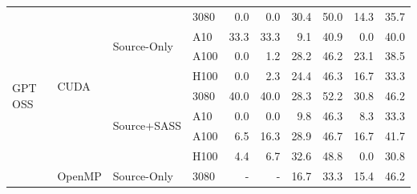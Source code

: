\begin{tabular}{@{}llllrrrrrr@{}}
\midrule
\multirow{16}{*}{GPT OSS} & \multirow{8}{*}{CUDA} & \multirow{4}{*}{Source-Only} & 3080 & \cellcolor[rgb]{1.000,1.000,1.000}0.0 & \cellcolor[rgb]{1.000,1.000,1.000}0.0 & \cellcolor[rgb]{1.000,0.851,0.851}30.4 & \cellcolor[rgb]{1.000,0.670,0.670}50.0 & \cellcolor[rgb]{1.000,0.955,0.955}14.3 & \cellcolor[rgb]{1.000,0.808,0.808}35.7 \\
 &  &  & A10 & \cellcolor[rgb]{1.000,0.828,0.828}33.3 & \cellcolor[rgb]{1.000,0.828,0.828}33.3 & \cellcolor[rgb]{1.000,0.978,0.978}9.1 & \cellcolor[rgb]{1.000,0.761,0.761}40.9 & \cellcolor[rgb]{1.000,1.000,1.000}0.0 & \cellcolor[rgb]{1.000,0.769,0.769}40.0 \\
 &  &  & A100 & \cellcolor[rgb]{1.000,1.000,1.000}0.0 & \cellcolor[rgb]{1.000,0.999,0.999}1.2 & \cellcolor[rgb]{1.000,0.868,0.868}28.2 & \cellcolor[rgb]{1.000,0.709,0.709}46.2 & \cellcolor[rgb]{1.000,0.904,0.904}23.1 & \cellcolor[rgb]{1.000,0.783,0.783}38.5 \\
 &  &  & H100 & \cellcolor[rgb]{1.000,1.000,1.000}0.0 & \cellcolor[rgb]{1.000,0.998,0.998}2.3 & \cellcolor[rgb]{1.000,0.895,0.895}24.4 & \cellcolor[rgb]{1.000,0.708,0.708}46.3 & \cellcolor[rgb]{1.000,0.943,0.943}16.7 & \cellcolor[rgb]{1.000,0.828,0.828}33.3 \\
\cmidrule(lr){3-10}
 &  & \multirow{4}{*}{Source+SASS} & 3080 & \cellcolor[rgb]{1.000,0.769,0.769}40.0 & \cellcolor[rgb]{1.000,0.769,0.769}40.0 & \cellcolor[rgb]{1.000,0.867,0.867}28.3 & \cellcolor[rgb]{1.000,0.647,0.647}52.2 & \cellcolor[rgb]{1.000,0.848,0.848}30.8 & \cellcolor[rgb]{1.000,0.709,0.709}46.2 \\
 &  &  & A10 & \cellcolor[rgb]{1.000,1.000,1.000}0.0 & \cellcolor[rgb]{1.000,1.000,1.000}0.0 & \cellcolor[rgb]{1.000,0.976,0.976}9.8 & \cellcolor[rgb]{1.000,0.708,0.708}46.3 & \cellcolor[rgb]{1.000,0.981,0.981}8.3 & \cellcolor[rgb]{1.000,0.828,0.828}33.3 \\
 &  &  & A100 & \cellcolor[rgb]{1.000,0.987,0.987}6.5 & \cellcolor[rgb]{1.000,0.945,0.945}16.3 & \cellcolor[rgb]{1.000,0.863,0.863}28.9 & \cellcolor[rgb]{1.000,0.704,0.704}46.7 & \cellcolor[rgb]{1.000,0.943,0.943}16.7 & \cellcolor[rgb]{1.000,0.753,0.753}41.7 \\
 &  &  & H100 & \cellcolor[rgb]{1.000,0.993,0.993}4.4 & \cellcolor[rgb]{1.000,0.987,0.987}6.7 & \cellcolor[rgb]{1.000,0.834,0.834}32.6 & \cellcolor[rgb]{1.000,0.683,0.683}48.8 & \cellcolor[rgb]{1.000,1.000,1.000}0.0 & \cellcolor[rgb]{1.000,0.848,0.848}30.8 \\
\cmidrule(lr){2-10}
 & \multirow{8}{*}{OpenMP} & \multirow{4}{*}{Source-Only} & 3080 & \cellcolor[rgb]{1.000,1.000,1.000}- & \cellcolor[rgb]{1.000,1.000,1.000}- & \cellcolor[rgb]{1.000,0.943,0.943}16.7 & \cellcolor[rgb]{1.000,0.828,0.828}33.3 & \cellcolor[rgb]{1.000,0.950,0.950}15.4 & \cellcolor[rgb]{1.000,0.709,0.709}46.2 \\

\end{tabular}
